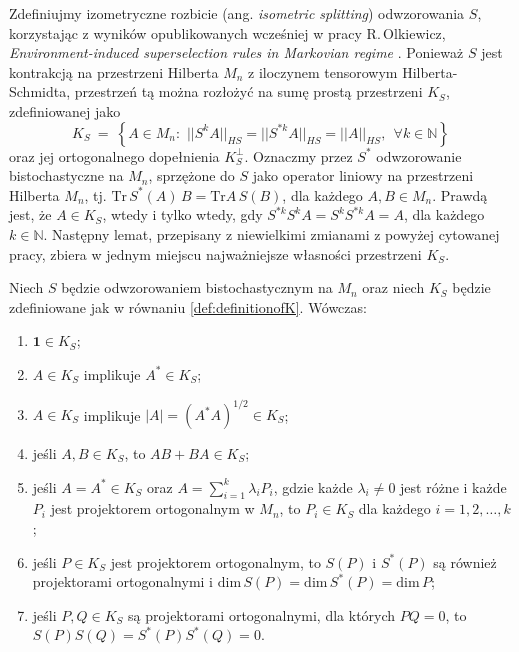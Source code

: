 {Zdefiniujmy izometryczne rozbicie (ang. \emph{isometric splitting})
odwzorowania $S$, korzystając z wyników opublikowanych wcześniej w pracy
R.\,Olkiewicz, \emph{Environment-induced superselection rules in Markovian regime}
\cite{olkiewicz1999environment}.
Ponieważ $S$ jest kontrakcją na przestrzeni Hilberta $M_{n}$
z iloczynem tensorowym Hilberta-Schmidta,
przestrzeń tą można rozłożyć na sumę prostą przestrzeni $K_{S}$,
zdefiniowanej jako
\begin{equation}
\label{def:definitionofK}
    K_{S} \: = \: \left\{
        A \in M_{n}: \,\,
            || S^{k} A ||_{HS} = || S^{* k} A ||_{HS} = || A ||_{HS}, \:\:
            \forall k \in \mathbb{N}
        \right\}
\end{equation}
oraz jej ortogonalnego dopełnienia $K_{S}^{\perp}$.
Oznaczmy przez $S^{*}$ odwzorowanie bistochastyczne na $M_{n}$,
sprzężone do $S$ jako operator liniowy na przestrzeni Hilberta $M_{n}$,
tj. $\text{Tr}\, S^{*} (A)\, B = \text{Tr} A \, S(B)$,
dla każdego $A, B \in M_{n}$.
Prawdą jest, że $A \in K_{S}$,
wtedy i tylko wtedy, gdy
$S^{* k} S^{k} A = S^{k} S^{* k} A = A$,
dla każdego $k \in \mathbb{N}$.
Następny lemat, przepisany z niewielkimi zmianami z
powyżej cytowanej pracy,
zbiera w jednym miejscu najważniejsze własności przestrzeni $K_{S}$.

\begin{Lemma}
\label{lem:propertiesofK}
Niech $S$ będzie odwzorowaniem bistochastycznym na $M_{n}$
oraz niech $K_{S}$ będzie zdefiniowane jak w równaniu
\eqref{def:definitionofK}.
Wówczas:
\let \oldlabelenumi \labelenumi
\renewcommand{\labelenumi}{\alph{enumi})}
\begin{enumerate}
\item $\mathbf{1} \in K_{S}$;
\item $A \in K_{S}$ implikuje $A^{*} \in K_{S}$;
\item  $A  \in K_{S}$ implikuje
$|A| = (A^{*}A)^{1/2} \in K_{S}$;
\item jeśli $A, B \in K_{S}$, to $AB + BA \in K_{S}$;
\item jeśli $A = A^{*} \in K_{S}$ oraz $A = \sum_{i=1}^{k} \lambda_{i} P_{i}$,
gdzie każde $\lambda_{i} \neq 0$ jest różne i
każde $P_{i}$ jest projektorem ortogonalnym w $M_{n}$,
to $P_{i} \in K_{S}$ dla każdego $i = 1,2,\ldots,k$;
\item jeśli $P \in K_{S}$ jest projektorem ortogonalnym,
to $S(P)$ i $S^{*}(P)$ są również projektorami ortogonalnymi i
$\mathrm{dim} \, S(P) = \mathrm{dim} \, S^{*}(P) = \mathrm{dim} \, P$;
\item jeśli $P, Q \in K_{S}$ są projektorami ortogonalnymi, dla których
$P Q = 0$,
to $S(P) S(Q) = S^{*}(P) S^{*}(Q) = 0$.
\end{enumerate}
\let \labelenumi \oldlabelenumi
\end{Lemma}

}
